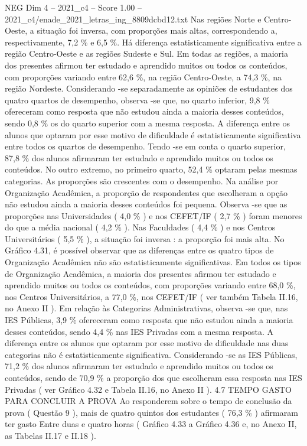 \begin{textsample}{NEG Dim 4 – 2021\_c4 – Score 1.00 – 2021\_c4/enade\_2021\_letras\_ing\_8809dcbd12.txt}
Nas regiões Norte e Centro-Oeste, a situação foi inversa, com proporções mais altas, correspondendo a, respectivamente, 7,2 \% e 6,5 \%.
Há diferença estatisticamente significativa entre a região Centro-Oeste e as regiões Sudeste e Sul.
Em todas as regiões, a maioria dos presentes afirmou ter estudado e aprendido muitos ou todos os conteúdos, com proporções variando entre 62,6 \%, na região Centro-Oeste, a 74,3 \%, na região Nordeste.
Considerando -se separadamente as opiniões de estudantes dos quatro quartos de desempenho, observa -se que, no quarto inferior, 9,8 \% ofereceram como resposta que não estudou ainda a maioria desses conteúdos, sendo 0,8 \% os do quarto superior com a mesma resposta.
A diferença entre os alunos que optaram por esse motivo de dificuldade é estatisticamente significativa entre todos os quartos de desempenho.
Tendo -se em conta o quarto superior, 87,8 \% dos alunos afirmaram ter estudado e aprendido muitos ou todos os conteúdos.
No outro extremo, no primeiro quarto, 52,4 \% optaram pelas mesmas categorias.
As proporções são crescentes com o desempenho.
Na análise por Organização Acadêmica, a proporção de respondentes que escolheram a opção não estudou ainda a maioria desses conteúdos foi pequena.
Observa -se que as proporções nas Universidades ( 4,0 \% ) e nos CEFET/IF ( 2,7 \% ) foram menores do que a média nacional ( 4,2 \% ).
Nas Faculdades ( 4,4 \% ) e nos Centros Universitários ( 5,5 \% ), a situação foi inversa : a proporção foi mais alta.
No Gráfico 4.31, é possível observar que as diferenças entre os quatro tipos de Organização Acadêmica não são estatisticamente significativas.
Em todos os tipos de Organização Acadêmica, a maioria dos presentes afirmou ter estudado e aprendido muitos ou todos os conteúdos, com proporções variando entre 68,0 \%, nos Centros Universitários, a 77,0 \%, nos CEFET/IF ( ver também Tabela II.16, no Anexo II ).
Em relação às Categorias Administrativas, observa -se que, nas IES Públicas, 3,9 \% ofereceram como resposta que não estudou ainda a maioria desses conteúdos, sendo 4,4 \% nas IES Privadas com a mesma resposta.
A diferença entre os alunos que optaram por esse motivo de dificuldade nas duas categorias não é estatisticamente significativa.
Considerando -se as IES Públicas, 71,2 \% dos alunos afirmaram ter estudado e aprendido muitos ou todos os conteúdos, sendo de 70,9 \% a proporção dos que escolheram essa resposta nas IES Privadas ( ver Gráfico 4.32 e Tabela II.16, no Anexo II ). 4.7 TEMPO GASTO PARA CONCLUIR A PROVA Ao responderem sobre o tempo de conclusão da prova ( Questão 9 ), mais de quatro quintos dos estudantes ( 76,3 \% ) afirmaram ter gasto Entre duas e quatro horas ( Gráfico 4.33 a Gráfico 4.36 e, no Anexo II, as Tabelas II.17 e II.18 ).

\end{textsample}
